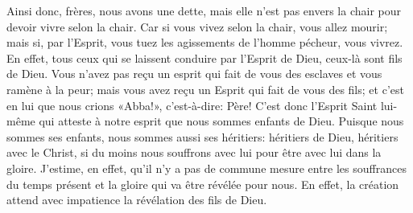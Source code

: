 Ainsi donc, frères, nous avons une dette,
	mais elle n’est pas envers la chair pour devoir vivre selon la chair.
Car si vous vivez selon la chair, vous allez mourir;
	mais si, par l’Esprit, vous tuez les agissements de l’homme pécheur, vous vivrez.
En effet, tous ceux qui se laissent conduire par l’Esprit de Dieu,
	ceux-là sont fils de Dieu.
Vous n’avez pas reçu un esprit qui fait de vous des esclaves et vous ramène à la peur;
	mais vous avez reçu un Esprit qui fait de vous des fils;
	et c’est en lui que nous crions «Abba!», c’est-à-dire: Père!
C’est donc l’Esprit Saint lui-même
		qui atteste à notre esprit que nous sommes enfants de Dieu.
Puisque nous sommes ses enfants, nous sommes aussi ses héritiers:
	héritiers de Dieu, héritiers avec le Christ,
	si du moins nous souffrons avec lui pour être avec lui dans la gloire.
J’estime, en effet,
	qu’il n’y a pas de commune mesure entre les souffrances du temps présent
	et la gloire qui va être révélée pour nous.
En effet, la création attend avec impatience la révélation des fils de Dieu.

